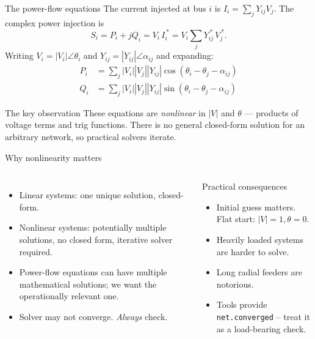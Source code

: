 \documentclass[aspectratio=169,10pt]{beamer}
\newcommand{\code}[1]{\texttt{#1}}
\begin{document}
\begin{frame}{The power-flow equations}
The current injected at bus $i$ is $I_i = \sum_j Y_{ij} V_j$. The complex power injection is
\begin{equation*}
S_i = P_i + jQ_i = V_i \, I_i^{\,*} = V_i \sum_j Y_{ij}^{\,*} \, V_j^{\,*}.
\end{equation*}
Writing $V_i = |V_i| \angle \theta_i$ and $Y_{ij} = |Y_{ij}|\angle \alpha_{ij}$ and expanding:
\begin{align*}
P_i &= \sum_j |V_i| |V_j| |Y_{ij}| \cos(\theta_i - \theta_j - \alpha_{ij}) \\
Q_i &= \sum_j |V_i| |V_j| |Y_{ij}| \sin(\theta_i - \theta_j - \alpha_{ij})
\end{align*}
\begin{alertblock}{The key observation}
These equations are \emph{nonlinear} in $|V|$ and $\theta$ --- products of voltage terms and trig functions. There is no general closed-form solution for an arbitrary network, so practical solvers iterate.
\end{alertblock}
\end{frame}

\begin{frame}{Why nonlinearity matters}
\begin{columns}[T]
\begin{itemize}
  \item Linear systems: one unique solution, closed-form.
  \item Nonlinear systems: potentially multiple solutions, no closed form, iterative solver required.
  \item Power-flow equations can have multiple mathematical solutions; we want the operationally relevant one.
  \item Solver may not converge. \emph{Always} check.
\end{itemize}
\begin{block}{Practical consequences}
\begin{itemize}
  \item Initial guess matters. Flat start: $|V|=1, \theta=0$.
  \item Heavily loaded systems are harder to solve.
  \item Long radial feeders are notorious.
  \item Tools provide \code{net.converged} -- treat it as a load-bearing check.
\end{itemize}
\end{block}
\end{columns}
\end{frame}
\end{document}
